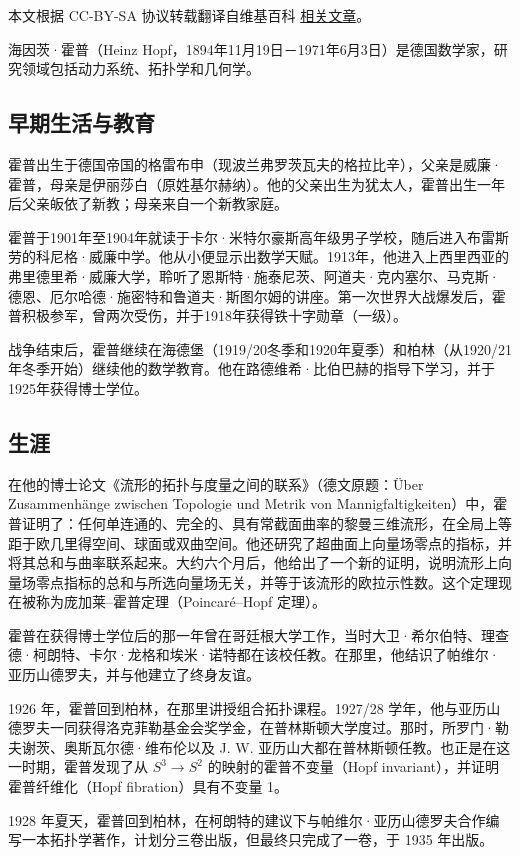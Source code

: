 
本文根据 CC-BY-SA 协议转载翻译自维基百科 \href{https://en.wikipedia.org/wiki/Heinz_Hopf}{相关文章}。

海因茨·霍普（Heinz Hopf，1894年11月19日－1971年6月3日）是德国数学家，研究领域包括动力系统、拓扑学和几何学。
\subsection{早期生活与教育}
霍普出生于德国帝国的格雷布申（现波兰弗罗茨瓦夫的格拉比辛），父亲是威廉·霍普，母亲是伊丽莎白（原姓基尔赫纳）。他的父亲出生为犹太人，霍普出生一年后父亲皈依了新教；母亲来自一个新教家庭。

霍普于1901年至1904年就读于卡尔·米特尔豪斯高年级男子学校，随后进入布雷斯劳的科尼格·威廉中学。他从小便显示出数学天赋。1913年，他进入上西里西亚的弗里德里希·威廉大学，聆听了恩斯特·施泰尼茨、阿道夫·克内塞尔、马克斯·德恩、厄尔哈德·施密特和鲁道夫·斯图尔姆的讲座。第一次世界大战爆发后，霍普积极参军，曾两次受伤，并于1918年获得铁十字勋章（一级）。

战争结束后，霍普继续在海德堡（1919/20冬季和1920年夏季）和柏林（从1920/21年冬季开始）继续他的数学教育。他在路德维希·比伯巴赫的指导下学习，并于1925年获得博士学位。
\subsection{生涯}
在他的博士论文《流形的拓扑与度量之间的联系》（德文原题：Über Zusammenhänge zwischen Topologie und Metrik von Mannigfaltigkeiten）中，霍普证明了：任何单连通的、完全的、具有常截面曲率的黎曼三维流形，在全局上等距于欧几里得空间、球面或双曲空间。他还研究了超曲面上向量场零点的指标，并将其总和与曲率联系起来。大约六个月后，他给出了一个新的证明，说明流形上向量场零点指标的总和与所选向量场无关，并等于该流形的欧拉示性数。这个定理现在被称为庞加莱–霍普定理（Poincaré–Hopf 定理）。

霍普在获得博士学位后的那一年曾在哥廷根大学工作，当时大卫·希尔伯特、理查德·柯朗特、卡尔·龙格和埃米·诺特都在该校任教。在那里，他结识了帕维尔·亚历山德罗夫，并与他建立了终身友谊。

1926 年，霍普回到柏林，在那里讲授组合拓扑课程。1927/28 学年，他与亚历山德罗夫一同获得洛克菲勒基金会奖学金，在普林斯顿大学度过。那时，所罗门·勒夫谢茨、奥斯瓦尔德·维布伦以及 J. W. 亚历山大都在普林斯顿任教。也正是在这一时期，霍普发现了从
$S^3 \to S^2$ 的映射的霍普不变量（Hopf invariant），并证明霍普纤维化（Hopf fibration）具有不变量 1。

1928 年夏天，霍普回到柏林，在柯朗特的建议下与帕维尔·亚历山德罗夫合作编写一本拓扑学著作，计划分三卷出版，但最终只完成了一卷，于 1935 年出版。

